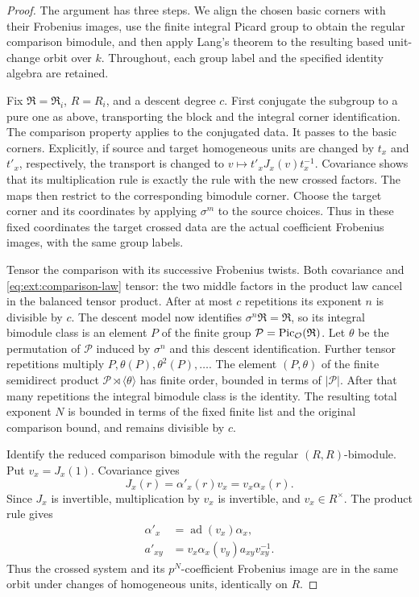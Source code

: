 \begin{proof}
The argument has three steps.  We align the chosen basic corners
with their Frobenius images, use the finite integral Picard group
to obtain the regular comparison bimodule, and then apply Lang's
theorem to the resulting based unit-change orbit over $k$.
Throughout, each group label and the specified identity algebra
are retained.

Fix $\mathfrak R=\mathfrak R_i$, $R=R_i$, and a descent degree $c$.
First conjugate the subgroup to a pure one as above, transporting
the block and the integral corner identification.  The comparison
property applies to the conjugated data.  It passes to the basic
corners.  Explicitly, if source and target homogeneous units are
changed by $t_x$ and $t'_x$, respectively, the transport is changed
to $v\mapsto t'_xJ_x(v)t_x^{-1}$.  Covariance shows that its
multiplication rule is exactly the rule with the new crossed
factors.  The maps then restrict to the corresponding bimodule
corner.  Choose the target corner and its coordinates by applying
$\sigma^m$ to the source choices.  Thus in these fixed coordinates
the target crossed data are the actual coefficient Frobenius
images, with the same group labels.

Tensor the comparison with its successive Frobenius twists.  Both
covariance and \eqref{eq:ext:comparison-law} tensor: the two middle
factors in the product law cancel in the balanced tensor product.
After at most $c$ repetitions its exponent $n$ is divisible by
$c$.  The descent model now identifies
$\sigma^n\mathfrak R=\mathfrak R$, so its integral bimodule class
is an element $P$ of the finite group
$\mathcal P=\operatorname{Pic}_{\mathcal O}(\mathfrak R)$.  Let $\theta$ be the
permutation of $\mathcal P$ induced by $\sigma^n$ and this descent
identification.  Further tensor repetitions multiply
$P,\theta(P),\theta^2(P),\ldots$.  The element $(P,\theta)$ of
the finite semidirect product
$\mathcal P\rtimes\langle\theta\rangle$ has finite order, bounded
in terms of $|\mathcal P|$.  After that many repetitions the
integral bimodule class is the identity.  The resulting total
exponent $N$ is bounded in terms of the fixed finite list and the
original comparison bound, and remains divisible by $c$.

Identify the reduced comparison bimodule with the regular
$(R,R)$-bimodule.  Put $v_x=J_x(1)$.  Covariance gives
\[
 J_x(r)=\alpha'_x(r)v_x=v_x\alpha_x(r).
\]
Since $J_x$ is invertible, multiplication by $v_x$ is invertible,
and $v_x\in R^\times$.  The product rule gives
\begin{align}
 \alpha'_x&=\operatorname{ad}(v_x)\alpha_x,
 \label{eq:ext:gauge-action}\\
 a'_{xy}&=v_x\alpha_x(v_y)a_{xy}v_{xy}^{-1}.
 \label{eq:ext:gauge-factors}
\end{align}
Thus the crossed system and its $p^N$-coefficient Frobenius image
are in the same orbit under changes of homogeneous units,
identically on $R$.


\end{proof}
